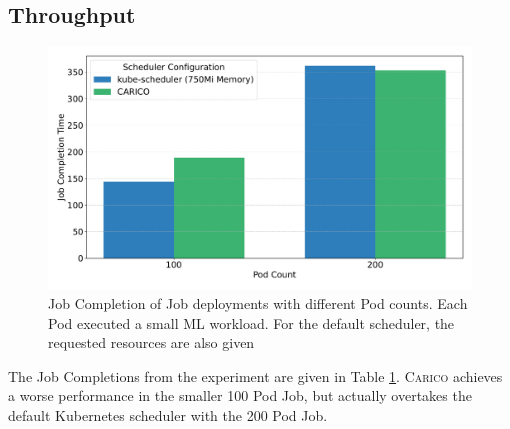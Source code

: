 \subsection{Throughput}

\begin{figure}[ht!]
    \centering
    \includegraphics[width=\textwidth]{images/ml-job-completion.pdf}
    \caption{Job Completion of Job deployments with different Pod counts. Each
    Pod executed a small ML workload. For the default scheduler, the requested
    resources are also given}
    \label{tab:ml-throughput}
\end{figure}

The Job Completions from the experiment are given in Table
\ref{tab:ml-throughput}. \textsc{Carico} achieves a worse performance in the smaller 100
Pod Job, but actually overtakes the default Kubernetes scheduler with the 200
Pod Job.

